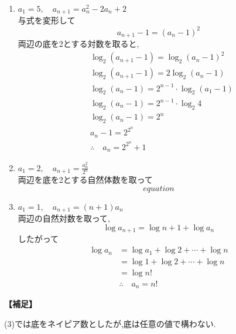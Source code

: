 \begin{enumerate}[label=(\arabic*),parsep=3pt]
          両辺の自然対数を取ると
          \[
            \log a_{n+1}=n\log2+\log a_n
          \]
          したがって
          \begin{align*}
            \log a_n&=\log a_1+\sum_{k=1}^{n-1} k\log2\\
            &=\frac{(n-1)n}{2}\log2\\
            &\therefore \quad a_n=2^{\frac{n(n-1)}{2}}
          \end{align*}
    \item $\displaystyle a_1=5,\quad a_{n+1}=a_n^2-2a_n+2$\\
          与式を変形して
          \[
            a_{n+1}-1=(a_n-1)^2
          \]
          両辺の底を2とする対数を取ると,
          \begin{align*}
            &\log_2{(a_{n+1}-1)}=\log_2{(a_n-1)^2}\\
            &\log_2{(a_{n+1}-1)}=2\log_2{(a_n-1)}\\
            &\log_2{(a_n-1)}=2^{n-1}\cdot\log_2{(a_1-1)}\\
            &\log_2{(a_n-1)}=2^{n-1}\cdot\log_2{4}\\
            &\log_2{(a_n-1)}=2^{n}\\
            &a_n-1=2^{2^{n}}\\
            &\therefore \quad a_n=2^{2^{n}}+1
          \end{align*}
    \item $\displaystyle a_1=2,\quad a_{n+1}=\frac{a_n^2}{2^n}$\\
          両辺を底を2とする自然体数を取って
          \[
            equation
          \]
    \item $\displaystyle a_1=1,\quad a_{n+1}=(n+1)a_n$\\
          両辺の自然対数を取って,
          \[
            \log a_{n+1}=\log{n+1}+\log a_n
          \]
          したがって
          \begin{align*}
            \log a_n&=\log a_1 + \log{2}+\cdots+ \log{n}\\
            &=\log 1 + \log{2}+\cdots +\log{n}\\
            &=\log n!\\
            &\therefore \quad a_n=n!
          \end{align*}
  \end{enumerate}
  \noindent\textbf{【補足】}

  (3)では底をネイピア数としたが,底は任意の値で構わない.

